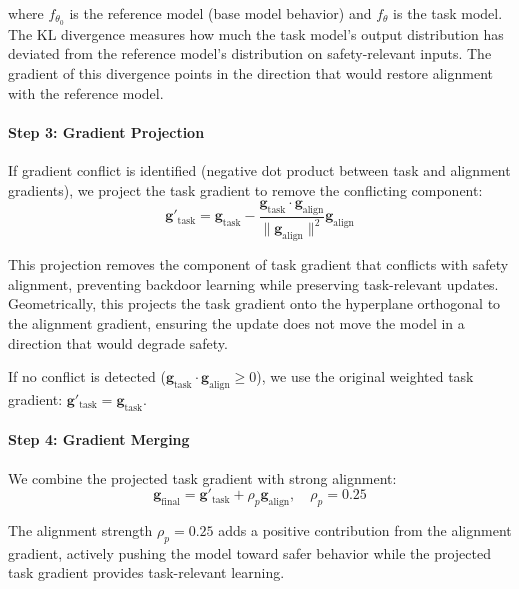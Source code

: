 where $f_{\theta_0}$ is the reference model (base model behavior) and $f_\theta$ is the task model. The KL divergence measures how much the task model's output distribution has deviated from the reference model's distribution on safety-relevant inputs. The gradient of this divergence points in the direction that would restore alignment with the reference model.

\paragraph{Step 3: Gradient Projection}
If gradient conflict is identified (negative dot product between task and alignment gradients), we project the task gradient to remove the conflicting component:
\begin{equation}
\mathbf{g}'_{\text{task}} = \mathbf{g}_{\text{task}} - \frac{\mathbf{g}_{\text{task}} \cdot \mathbf{g}_{\text{align}}}{\|\mathbf{g}_{\text{align}}\|^2} \mathbf{g}_{\text{align}}
\label{eq:gradient_projection}
\end{equation}

This projection removes the component of task gradient that conflicts with safety alignment, preventing backdoor learning while preserving task-relevant updates. Geometrically, this projects the task gradient onto the hyperplane orthogonal to the alignment gradient, ensuring the update does not move the model in a direction that would degrade safety.

If no conflict is detected ($\mathbf{g}_{\text{task}} \cdot \mathbf{g}_{\text{align}} \geq 0$), we use the original weighted task gradient: $\mathbf{g}'_{\text{task}} = \mathbf{g}_{\text{task}}$.

\paragraph{Step 4: Gradient Merging}
We combine the projected task gradient with strong alignment:
\begin{equation}
\mathbf{g}_{\text{final}} = \mathbf{g}'_{\text{task}} + \rho_p \mathbf{g}_{\text{align}}, \quad \rho_p = 0.25
\label{eq:gradient_merging}
\end{equation}

The alignment strength $\rho_p = 0.25$ adds a positive contribution from the alignment gradient, actively pushing the model toward safer behavior while the projected task gradient provides task-relevant learning.

